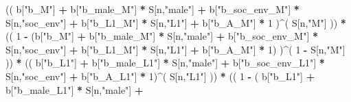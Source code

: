 \documentclass[
]{book}
\newenvironment{Shaded}{\begin{snugshade}}{\end{snugshade}}
\newcommand{\DecValTok}[1]{\textcolor[rgb]{0.00,0.00,0.81}{#1}}
\newcommand{\NormalTok}[1]{#1}
\newcommand{\SpecialCharTok}[1]{\textcolor[rgb]{0.81,0.36,0.00}{\textbf{#1}}}
\newcommand{\StringTok}[1]{\textcolor[rgb]{0.31,0.60,0.02}{#1}}
\begin{document}
\begin{Shaded}
\begin{Highlighting}[]
\NormalTok{                    (( b[}\StringTok{"b\_M"}\NormalTok{] }\SpecialCharTok{+} 
\NormalTok{                           b[}\StringTok{"b\_male\_M"}\NormalTok{] }\SpecialCharTok{*}\NormalTok{ S[n,}\StringTok{"male"}\NormalTok{] }\SpecialCharTok{+} 
\NormalTok{                           b[}\StringTok{"b\_soc\_env\_M"}\NormalTok{] }\SpecialCharTok{*}\NormalTok{ S[n,}\StringTok{"soc\_env"}\NormalTok{] }\SpecialCharTok{+} 
\NormalTok{                           b[}\StringTok{"b\_L1\_M"}\NormalTok{] }\SpecialCharTok{*}\NormalTok{ S[n,}\StringTok{"L1"}\NormalTok{] }\SpecialCharTok{+}
\NormalTok{                           b[}\StringTok{"b\_A\_M"}\NormalTok{] }\SpecialCharTok{*} \DecValTok{1}\NormalTok{ )}\SpecialCharTok{\^{}}\NormalTok{( S[n,}\StringTok{"M"}\NormalTok{] )) }\SpecialCharTok{*}
\NormalTok{                    (( }\DecValTok{1} \SpecialCharTok{{-}}\NormalTok{ (b[}\StringTok{"b\_M"}\NormalTok{] }\SpecialCharTok{+} 
\NormalTok{                              b[}\StringTok{"b\_male\_M"}\NormalTok{] }\SpecialCharTok{*}\NormalTok{ S[n,}\StringTok{"male"}\NormalTok{] }\SpecialCharTok{+} 
\NormalTok{                              b[}\StringTok{"b\_soc\_env\_M"}\NormalTok{] }\SpecialCharTok{*}\NormalTok{ S[n,}\StringTok{"soc\_env"}\NormalTok{] }\SpecialCharTok{+} 
\NormalTok{                              b[}\StringTok{"b\_L1\_M"}\NormalTok{] }\SpecialCharTok{*}\NormalTok{ S[n,}\StringTok{"L1"}\NormalTok{] }\SpecialCharTok{+}
\NormalTok{                              b[}\StringTok{"b\_A\_M"}\NormalTok{] }\SpecialCharTok{*} \DecValTok{1}\NormalTok{) )}\SpecialCharTok{\^{}}\NormalTok{( }\DecValTok{1} \SpecialCharTok{{-}}\NormalTok{ S[n,}\StringTok{"M"}\NormalTok{] )) }\SpecialCharTok{*}
\NormalTok{                        (( b[}\StringTok{"b\_L1"}\NormalTok{] }\SpecialCharTok{+}
\NormalTok{                             b[}\StringTok{"b\_male\_L1"}\NormalTok{] }\SpecialCharTok{*}\NormalTok{ S[n,}\StringTok{"male"}\NormalTok{] }\SpecialCharTok{+}  
\NormalTok{                             b[}\StringTok{"b\_soc\_env\_L1"}\NormalTok{] }\SpecialCharTok{*}\NormalTok{ S[n,}\StringTok{"soc\_env"}\NormalTok{] }\SpecialCharTok{+}
\NormalTok{                             b[}\StringTok{"b\_A\_L1"}\NormalTok{] }\SpecialCharTok{*} \DecValTok{1}\NormalTok{)}\SpecialCharTok{\^{}}\NormalTok{( S[n,}\StringTok{"L1"}\NormalTok{] )) }\SpecialCharTok{*}
\NormalTok{                        (( }\DecValTok{1} \SpecialCharTok{{-}}\NormalTok{ ( b[}\StringTok{"b\_L1"}\NormalTok{] }\SpecialCharTok{+}
\NormalTok{                                   b[}\StringTok{"b\_male\_L1"}\NormalTok{] }\SpecialCharTok{*}\NormalTok{ S[n,}\StringTok{"male"}\NormalTok{] }\SpecialCharTok{+}  

\end{Highlighting}
\end{Shaded}
\end{document}
